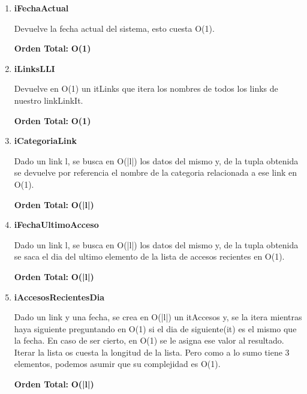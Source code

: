\begin{enumerate}

\item\textbf{iFechaActual}
\par Devuelve la fecha actual del sistema, esto cuesta O(1).
\par\textbf{Orden Total:} \textbf{O(1)}

\item\textbf{iLinksLLI}
\par Devuelve en O(1) un itLinks que itera los nombres de todos los links de nuestro linkLinkIt.
\par\textbf{Orden Total:} \textbf{O(1)}

\item\textbf{iCategoriaLink}
\par Dado un link l, se busca en O(|l|) los datos del mismo y, de la tupla obtenida se devuelve por referencia el nombre de la categoria relacionada a ese link en O(1).
\par\textbf{Orden Total:} \textbf{O(|l|)}

\item\textbf{iFechaUltimoAcceso}
\par Dado un link l, se busca en O(|l|) los datos del mismo y, de la tupla obtenida se saca el dia del ultimo elemento de la lista de accesos recientes en O(1).
\par\textbf{Orden Total:} \textbf{O(|l|)}

\item\textbf{iAccesosRecientesDia}
\par Dado un link y una fecha, se crea en O(|l|) un itAccesos y, se la itera mientras haya siguiente preguntando en O(1) si el dia de siguiente(it) es el mismo que la fecha. En caso de ser cierto, en O(1) se le asigna ese valor al resultado. Iterar la lista os cuesta la longitud de la lista. Pero como a lo sumo tiene 3 elementos, podemos asumir que su complejidad es O(1).
\par\textbf{Orden Total:} \textbf{O(|l|)}


\end{enumerate}
